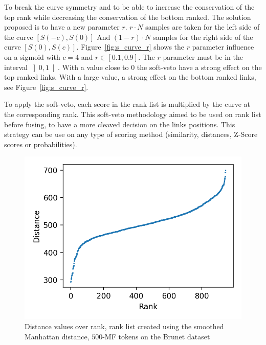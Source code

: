 To break the curve symmetry and to be able to increase the conservation of the top rank while decreasing the conservation of the bottom ranked.
The solution proposed is to have a new parameter $r$.
$r \cdot N$ samples are taken for the left side of the curve $\left[S(-c), S(0)\right]$
And $(1-r) \cdot N$ samples for the right side of the curve $\left[S(0), S(c)\right]$.
Figure~\ref{fig:s_curve_r} shows the $r$ parameter influence on a sigmoid with $c = 4$ and $r \in \left[0.1, 0.9\right]$.
The $r$ parameter must be in the interval $\left]0, 1\right[$.
With a value close to $0$ the soft-veto have a strong effect on the top ranked links.
With a large value, a strong effect on the bottom ranked links, see Figure~\ref{fig:s_curve_r}.

To apply the soft-veto, each score in the rank list is multiplied by the curve at the corresponding rank.
This soft-veto methodology aimed to be used on rank list before fusing, to have a more cleaved decision on the links positions.
This strategy can be use on any type of scoring method (similarity, distances, Z-Score scores or probabilities).

\begin{figure}
  \centering
  \caption{Distance values over rank, rank list created using the smoothed Manhattan distance, $500$-MF tokens on the Brunet dataset}
  \label{fig:distance_over_rank}
  \includegraphics[width=\linewidth]{img/distance_over_rank.png}
\end{figure}

